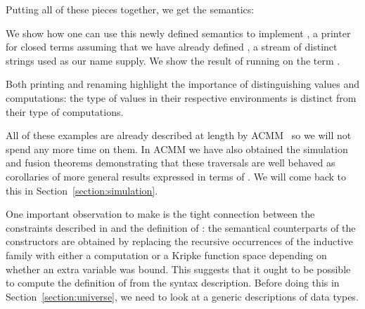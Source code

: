 \begin{agdasnippet}
\end{agdasnippet}

Putting all of these pieces together, we get the  semantics:

\begin{center}
\end{center}

We show how one can use this newly defined semantics to implement ,
a printer for closed terms assuming that we have already defined ,
a stream of distinct strings used as our name supply. We show the result of
running  on the term .

\noindent
\begin{minipage}[t]{0.5\textwidth}
\begin{agdasnippet}
\end{agdasnippet}
\end{minipage}
\quad
\begin{minipage}[t]{0.4\textwidth}
\begin{agdasnippet}
\end{agdasnippet}
\end{minipage}

Both printing and renaming highlight the importance of distinguishing
values and computations: the type of values in their respective
environments is distinct from their type of computations.

All of these examples are already described at length by ACMM~\citeyear{allais2017type}
so we will not spend any
more time on them. In ACMM we have also obtained the simulation and fusion
theorems demonstrating that these traversals are well behaved as
corollaries of more general results expressed in terms of \semfun{}.
We will come back to this in Section~\ref{section:simulation}.

One important observation to make is the tight connection between the constraints
described in \semrec{} and the definition of : the semantical counterparts
of the  constructors are obtained by replacing the recursive occurrences of
the inductive family with either a computation or a Kripke function space depending
on whether an extra variable was bound. This suggests that it ought to be possible
to compute the definition of \semrec{} from the syntax description. Before doing this
in Section~\ref{section:universe}, we need to look at a generic descriptions of
data types.



